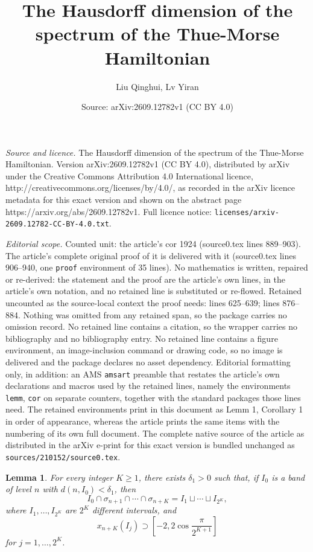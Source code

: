 \documentclass[10pt,a4paper]{amsart}
\title{The Hausdorff dimension of the spectrum of the Thue-Morse Hamiltonian}
\author{Liu Qinghui, Lv Yiran}
\date{Source: arXiv:2609.12782v1 (CC BY 4.0)}
\newtheorem{lemm}{Lemma}
\begin{document}
\maketitle

\noindent\emph{Source and licence.} The Hausdorff dimension of the spectrum of the Thue-Morse Hamiltonian. Version arXiv:2609.12782v1 (CC BY 4.0), distributed by arXiv under the Creative Commons Attribution 4.0 International licence, http://creativecommons.org/licenses/by/4.0/, as recorded in the arXiv licence metadata for this exact version and shown on the abstract page https://arxiv.org/abs/2609.12782v1. Full licence notice: \texttt{licenses/arxiv-2609.12782-CC-BY-4.0.txt}.\par\smallskip

\noindent\textit{Editorial scope.} Counted unit: the article's cor 1924 (source0.tex lines 889--903). The article's complete original proof of it is delivered with it (source0.tex lines 906--940, one \texttt{proof} environment of 35 lines). No mathematics is written, repaired or re-derived: the statement and the proof are the article's own lines, in the article's own notation, and no retained line is substituted or re-flowed.  Retained uncounted as the source-local context the proof needs: lines 625--639; lines 876--884.  Nothing was omitted from any retained span, so the package carries no omission record.  No retained line contains a citation, so the wrapper carries no bibliography and no bibliography entry.  No retained line contains a figure environment, an image-inclusion command or drawing code, so no image is delivered and the package declares no asset dependency.  Editorial formatting only, in addition: an AMS \texttt{amsart} preamble that restates the article's own declarations and macros used by the retained lines, namely the environments \texttt{lemm}, \texttt{cor} on separate counters, together with the standard packages those lines need.  The retained environments print in this document as Lemm 1, Corollary 1 in order of appearance, whereas the article prints the same items with the numbering of its own full document.  The complete native source of the article as distributed in the arXiv e-print for this exact version is bundled unchanged as \texttt{sources/210152/source0.tex}.
\begin{lemm}
\label{lemma3}
For every integer $K\ge 1$, there exists $\delta_1>0$ such that, 
if $I_0$ is a band of level $n$  with $d(n,I_0)<\delta_1$, then  
\begin{equation*}
 I_0\cap\sigma_{n+1}\cap\cdots\cap\sigma_{n+K}
=I_1\sqcup\cdots\sqcup I_{2^K},
\end{equation*}
    where $I_1,\ldots,I_{2^K}$ are $2^K$ different intervals,
    and
\begin{equation*}
    x_{n+K}(I_j)\supset [-2,2\cos{\frac{\pi}{2^{K+1}}}]
\end{equation*}
    for  $ j=1,\ldots, 2^K$.
\end{lemm}
\end{document}
